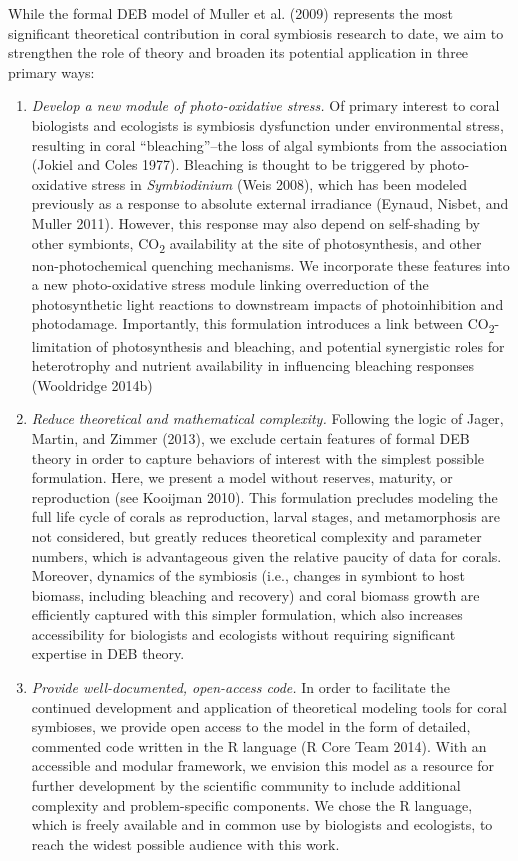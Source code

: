 \documentclass[]{elsarticle} %
\begin{document}
While the formal DEB model of Muller et al. (2009) represents the most
significant theoretical contribution in coral symbiosis research to
date, we aim to strengthen the role of theory and broaden its potential
application in three primary ways:

\begin{enumerate}
\def\labelenumi{\arabic{enumi}.}
\item
  \emph{Develop a new module of photo-oxidative stress.} Of primary
  interest to coral biologists and ecologists is symbiosis dysfunction
  under environmental stress, resulting in coral ``bleaching''--the loss
  of algal symbionts from the association (Jokiel and Coles 1977).
  Bleaching is thought to be triggered by photo-oxidative stress in
  \emph{Symbiodinium} (Weis 2008), which has been modeled previously as
  a response to absolute external irradiance (Eynaud, Nisbet, and Muller
  2011). However, this response may also depend on self-shading by other
  symbionts, CO\textsubscript{2} availability at the site of
  photosynthesis, and other non-photochemical quenching mechanisms. We
  incorporate these features into a new photo-oxidative stress module
  linking overreduction of the photosynthetic light reactions to
  downstream impacts of photoinhibition and photodamage. Importantly,
  this formulation introduces a link between
  CO\textsubscript{2}-limitation of photosynthesis and bleaching, and
  potential synergistic roles for heterotrophy and nutrient availability
  in influencing bleaching responses (Wooldridge 2014b)
\item
  \emph{Reduce theoretical and mathematical complexity.} Following the
  logic of Jager, Martin, and Zimmer (2013), we exclude certain features
  of formal DEB theory in order to capture behaviors of interest with
  the simplest possible formulation. Here, we present a model without
  reserves, maturity, or reproduction (see Kooijman 2010). This
  formulation precludes modeling the full life cycle of corals as
  reproduction, larval stages, and metamorphosis are not considered, but
  greatly reduces theoretical complexity and parameter numbers, which is
  advantageous given the relative paucity of data for corals. Moreover,
  dynamics of the symbiosis (i.e., changes in symbiont to host biomass,
  including bleaching and recovery) and coral biomass growth are
  efficiently captured with this simpler formulation, which also
  increases accessibility for biologists and ecologists without
  requiring significant expertise in DEB theory.
\item
  \emph{Provide well-documented, open-access code.} In order to
  facilitate the continued development and application of theoretical
  modeling tools for coral symbioses, we provide open access to the
  model in the form of detailed, commented code written in the R
  language (R Core Team 2014). With an accessible and modular framework,
  we envision this model as a resource for further development by the
  scientific community to include additional complexity and
  problem-specific components. We chose the R language, which is freely
  available and in common use by biologists and ecologists, to reach the
  widest possible audience with this work.
\end{enumerate}
\end{document}
